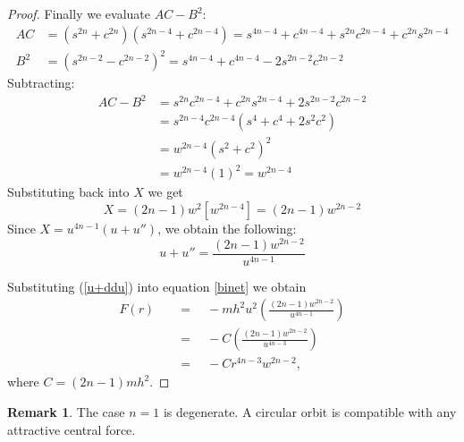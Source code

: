 \documentclass{amsart}
\theoremstyle{definition}
\newtheorem{remark}[theorem]{Remark}
\begin{document}
\begin{proof}
Finally we evaluate $AC - B^2$:
\begin{align*}
AC &= (s^{2n}+c^{2n})(s^{2n-4}+c^{2n-4}) = s^{4n-4} + c^{4n-4} + s^{2n}c^{2n-4} + c^{2n}s^{2n-4} \\
B^2 &= (s^{2n-2}-c^{2n-2})^2 = s^{4n-4} + c^{4n-4} - 2s^{2n-2}c^{2n-2}
\end{align*}
Subtracting:
\begin{align*}
AC - B^2 &= s^{2n}c^{2n-4} + c^{2n}s^{2n-4} + 2s^{2n-2}c^{2n-2} \\
&= s^{2n-4}c^{2n-4} ( s^4 + c^4 + 2s^2c^2 ) \\
&= w^{2n-4} (s^2+c^2)^2 \\
&= w^{2n-4}(1)^2=w^{2n-4}
\end{align*}
Substituting back into $X$ we get
$$ X = (2n-1) w^2 [ w^{2n-4} ] = (2n-1) w^{2n-2} $$
Since $X = u^{4n-1}(u+u'')$, we obtain the following:
\begin{equation}
u + u'' = \frac{(2n-1)w^{2n-2}}{u^{4n-1}}\label{u+ddu}
\end{equation}

Substituting (\ref{u+ddu}) into equation \eqref{binet} we obtain
\begin{align*}
F(r) &\quad=\quad -m h^2 u^2 \left( \frac{(2n-1)w^{2n-2}}{u^{4n-1}}\right)\\
&\quad=\quad -C\left( \frac{(2n-1)w^{2n-2}}{u^{4n-3}}\right)\\
&\quad=\quad -Cr^{4n-3}w^{2n-2},
\end{align*}
where $C=(2n-1)mh^2$.
\end{proof}

\bigskip

\begin{remark}
The case $n=1$ is degenerate. A circular orbit is compatible with any attractive central force.
\end{remark}

\bigskip
\end{document}
